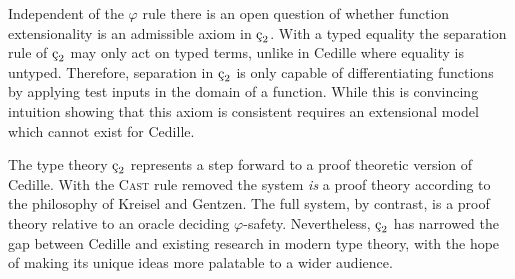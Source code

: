 Independent of the $\varphi$ rule there is an open question of whether function extensionality is an admissible axiom in $\ced$.
With a typed equality the separation rule of $\ced$ may only act on typed terms, unlike in Cedille where equality is untyped.
Therefore, separation in $\ced$ is only capable of differentiating functions by applying test inputs in the domain of a function.
While this is convincing intuition showing that this axiom is consistent requires an extensional model which cannot exist for Cedille.

The type theory $\ced$ represents a step forward to a proof theoretic version of Cedille.
With the \textsc{Cast} rule removed the system \textit{is} a proof theory according to the philosophy of Kreisel and Gentzen.
The full system, by contrast, is a proof theory relative to an oracle deciding $\varphi$-safety.
Nevertheless, $\ced$ has narrowed the gap between Cedille and existing research in modern type theory, with the hope of making its unique ideas more palatable to a wider audience.
